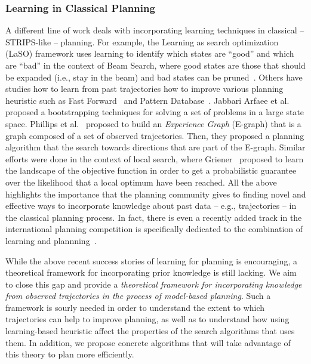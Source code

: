 \documentclass[12pt]{article}
\begin{document}
\subsubsection{Learning in Classical Planning}
A different line of work deals with incorporating learning techniques in classical -- STRIPS-like -- planning. For example, the Learning as search optimization (LaSO) framework uses learning to identify which states are ``good'' and which are ``bad''
in the context of Beam Search, where good states are those that should be expanded (i.e., stay in the beam) and bad states can be pruned~\cite{xu2007discriminative}. 
Others have studies how to learn from past trajectories how to improve various planning heuristic such as Fast Forward~\cite{yoon2006learning} and Pattern Database~\cite{samadi2008learning}. Jabbari Arfaee et al.~\cite{arfaee2011learning} proposed a bootstrapping techniques for solving a set of problems in a large state space. 
Phillips et al.~\cite{phillips2012graphs} proposed to build an {\em Experience Graph} (E-graph) that is a graph composed of a set of observed trajectories. Then, they proposed a planning algorithm that the search towards directions that are part of the E-graph. 
Similar efforts were done in the context of local search, 
where Griener~\cite{greiner1996palo} proposed to learn
the landscape of the objective function in order to get a probabilistic guarantee over the likelihood that a local optimum have been reached. 
All the above highlights the importance that the planning community gives to  finding novel and effective ways to incorporate knowledge about past data -- e.g., trajectories -- in the classical planning process. In fact, there is even a recently added track in the international planning competition is specifically dedicated to the combination of learning and plannning~\cite{fern2011first}.  




While the above recent success stories of learning for planning is encouraging, a theoretical framework for incorporating prior knowledge is still lacking. We aim to close this gap and provide a {\em theoretical framework for incorporating knowledge from observed trajectories in the process of model-based planning}. Such a framework is sourly needed in order to understand the extent to which trajectories can help to improve planning, as well as to understand how using learning-based heuristic affect the properties of the search algorithms that uses them. In addition, we propose concrete algorithms that will take advantage of this theory to plan more efficiently. 
\end{document}
